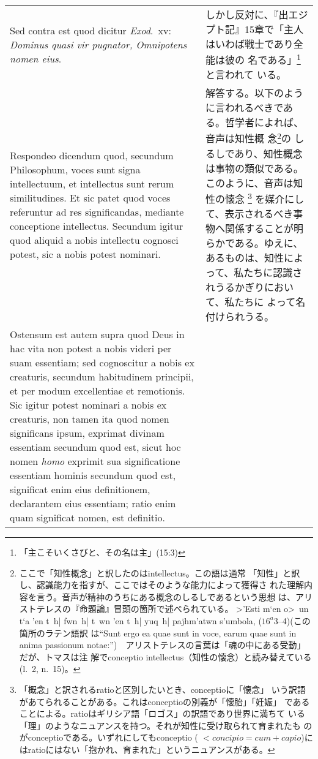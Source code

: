\documentclass[10pt]{jsarticle}
\begin{document}
\begin{longtable}{p{21em}p{21em}}
\\

{\sc Sed contra est} quod dicitur {\it Exod}.\ {\sc xv}: {\it Dominus
quasi vir pugnator, Omnipotens nomen eius}.

&

しかし反対に、『出エジプト記』15章で「主人はいわば戦士であり全能は彼の
名である」\footnote{「主こそいくさびと、その名は主」(15:3)}と言われて
いる。

\\

{\sc Respondeo dicendum} quod, secundum Philosophum, voces sunt signa
intellectuum, et intellectus sunt rerum similitudines. Et sic patet
quod voces referuntur ad res significandas, mediante conceptione
intellectus. Secundum igitur quod aliquid a nobis intellectu cognosci
potest, sic a nobis potest nominari.

&

解答する。以下のように言われるべきである。哲学者によれば、音声は知性概
念\footnote{ここで「知性概念」と訳したのはintellectus。この語は通常
「知性」と訳し、認識能力を指すが、ここではそのような能力によって獲得さ
れた理解内容を言う。音声が精神のうちにある概念のしるしであるという思想
は、アリストテレスの『命題論』冒頭の箇所で述べられている。
\foreignlanguage{greek}{>'Esti m`en o>~un t`a 'en t~h| fwn~h| t~wn 'en
t~h| yuq~h| pajhm'atwn s'umbola,} ($16^{a}3$--4)(この箇所のラテン語訳
は``Sunt ergo ea quae sunt in voce, earum quae sunt in anima passionum
notae:'')　アリストテレスの言葉は「魂の中にある受動」だが、トマスは注
解でconceptio intellectus（知性の懐念）と読み替えている(l.~2, n.~15)。}の
しるしであり、知性概念は事物の類似である。このように、音声は知性の懐念
\footnote{「概念」と訳されるratioと区別したいとき、conceptioに「懐念」
いう訳語があてられることがある。これはconceptioの別義が「懐胎」「妊娠」
であることによる。ratioはギリシア語「ロゴス」の訳語であり世界に満ちて
いる「理」のようなニュアンスを持つ。それが知性に受け取られて育まれたも
のがconceptioである。いずれにしてもconceptio ( $< concipio = cum +
capio$)にはratioにはない「抱かれ、育まれた」というニュアンスがある。}
を媒介にして、表示されるべき事物へ関係することが明らかである。ゆえに、
あるものは、知性によって、私たちに認識されうるかぎりにおいて、私たちに
よって名付けられうる。

\\

Ostensum est autem supra quod Deus in hac vita non potest a nobis
videri per suam essentiam; sed cognoscitur a nobis ex creaturis,
secundum habitudinem principii, et per modum excellentiae et
remotionis. Sic igitur potest nominari a nobis ex creaturis, non tamen
ita quod nomen significans ipsum, exprimat divinam essentiam secundum
quod est, sicut hoc nomen {\it homo} exprimit sua significatione
essentiam hominis secundum quod est, significat enim eius
definitionem, declarantem eius essentiam; ratio enim quam significat
nomen, est definitio.


\end{longtable}
\end{document}
